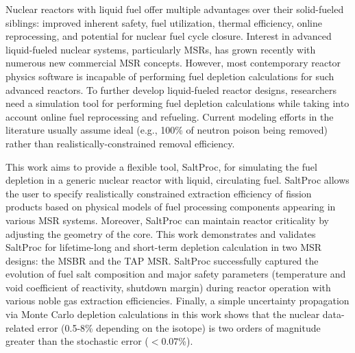 Nuclear reactors with liquid fuel offer multiple advantages over their 
solid-fueled siblings: improved inherent safety, fuel utilization, thermal 
efficiency, online reprocessing, and potential for nuclear fuel cycle closure. 
Interest in advanced liquid-fueled nuclear systems, particularly \glspl{MSR}, 
has grown recently with numerous new commercial \gls{MSR} concepts. 
However, most contemporary reactor physics software is incapable of performing 
fuel depletion calculations for such advanced reactors. To further 
develop liquid-fueled reactor designs, researchers need a simulation tool for 
performing fuel depletion calculations while taking into account online fuel 
reprocessing and refueling. Current modeling efforts in the literature usually 
assume ideal (e.g., 100\% of neutron poison being removed) rather than 
realistically-constrained removal efficiency. 

This work aims to provide a flexible tool, SaltProc, for simulating the fuel 
depletion in a generic nuclear reactor with liquid, circulating fuel. 
SaltProc allows the user to specify realistically constrained extraction 
efficiency of fission products based on physical models of fuel processing 
components appearing in various \gls{MSR} systems. Moreover, SaltProc can 
maintain reactor criticality by adjusting the geometry of the core. This 
work demonstrates and validates SaltProc for lifetime-long and short-term 
depletion calculation in two \gls{MSR} designs: the \gls{MSBR} and the 
\gls{TAP} \gls{MSR}. SaltProc successfully captured the evolution of fuel salt 
composition and major safety parameters (temperature and void coefficient of 
reactivity, shutdown margin) during reactor operation with various noble gas 
extraction efficiencies. Finally, a simple uncertainty propagation via Monte 
Carlo depletion calculations in this work shows that the nuclear data-related 
error (0.5-8\% depending on the isotope) is two orders of magnitude greater 
than the stochastic error 
($<0.07$\%).